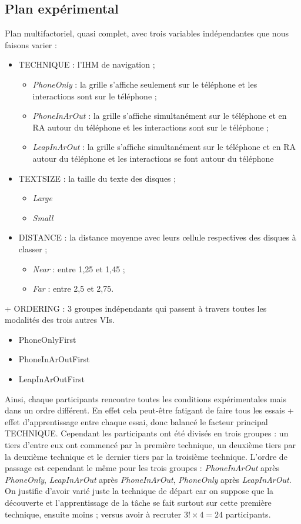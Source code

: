 \subsection{Plan expérimental}
Plan multifactoriel, quasi complet, avec trois variables indépendantes que nous faisons varier :
\begin{itemize}
  \item \textsc{TECHNIQUE} : l'IHM de navigation ;
  \begin{itemize}
    \item \textit{PhoneOnly} : la grille s'affiche seulement sur le téléphone et les interactions sont sur le téléphone ;
    \item \textit{PhoneInArOut} : la grille s'affiche simultanément sur le téléphone et en RA autour du téléphone et les interactions sont sur le téléphone ;
    \item \textit{LeapInArOut} : la grille s'affiche simultanément sur le téléphone et en RA autour du téléphone et les interactions se font autour du téléphone
  \end{itemize}
  \item \textsc{TEXTSIZE} : la taille du texte des disques ;
  \begin{itemize}
    \item \textit{Large}
    \item \textit{Small}
  \end{itemize}
  \item \textsc{DISTANCE} : la distance moyenne avec leurs cellule respectives des disques à classer ;
  \begin{itemize}
    \item \textit{Near} : entre 1,25 et 1,45 ;
    \item \textit{Far} : entre 2,5 et 2,75.
  \end{itemize}
\end{itemize}

+ ORDERING : 3 groupes indépendants qui passent à travers toutes les modalités des trois autres VIs.
\begin{itemize}
  \item PhoneOnlyFirst
  \item PhoneInArOutFirst
  \item LeapInArOutFirst
\end{itemize}

Ainsi, chaque participants rencontre toutes les conditions expérimentales mais dans un ordre différent. En effet cela peut-être fatigant de faire tous les essais + effet d'apprentissage entre chaque essai, donc balancé le facteur principal \textsc{TECHNIQUE}. Cependant les participants ont été divisés en trois groupes : un tiers d'entre eux ont commencé par la première technique, un deuxième tiers par la deuxième technique et le dernier tiers par la troisième technique. L'ordre de passage est cependant le même pour les trois groupes : \textit{PhoneInArOut} après \textit{PhoneOnly}, \textit{LeapInArOut} après \textit{PhoneInArOut}, \textit{PhoneOnly} après \textit{LeapInArOut}. On justifie d'avoir varié juste la technique de départ car on suppose que la découverte et l'apprentissage de la tâche se fait surtout sur cette première technique, ensuite moins ; versus avoir à recruter $3! \times 4 = 24$ participants.

